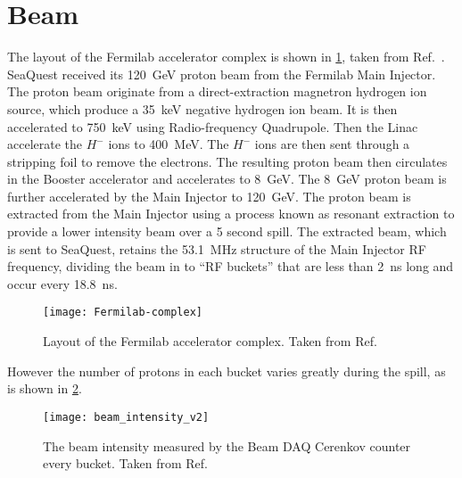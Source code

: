 \documentclass[../main.tex]{subfiles}
\begin{document}
\section{Beam}
The layout of the Fermilab accelerator complex is shown in \cref{fig:complex},
taken from Ref.~\cite{concept-book}.
SeaQuest received its \SI{120}{\GeV} proton beam from the Fermilab Main Injector.
The proton beam originate from a direct-extraction magnetron hydrogen ion source,
which produce a \SI{35}{\keV} negative hydrogen ion beam. It is then accelerated
to \SI{750}{\keV} using Radio-frequency Quadrupole. Then the Linac accelerate the
$H^-$ ions to \SI{400}{\MeV}. The $H^-$ ions are then sent through a stripping foil
to remove the electrons. The resulting proton beam then circulates in the Booster
accelerator and accelerates to \SI{8}{\GeV}. The \SI{8}{\GeV} proton beam is
further accelerated by the Main Injector to \SI{120}{\GeV}. The proton beam is
extracted from the Main Injector using a process known as resonant extraction to
provide a lower intensity beam over a 5 second spill. The extracted beam, which
is sent to SeaQuest, retains the \SI{53.1}{\MHz} structure of the Main
Injector RF frequency, dividing the beam in to ``RF buckets'' that are less than
\SI{2}{\ns} long and occur every \SI{18.8}{\ns}.
\begin{figure}[htbp!]
	\centering
	\texttt{[image: Fermilab-complex]}
	\caption{Layout of the Fermilab accelerator complex. Taken from Ref.~\cite{concept-book}}
	\label{fig:complex}
\end{figure}
However the number of protons in each bucket varies greatly during the spill, as
is shown in \cref{fig:intensity}.
\begin{figure}[htpb!]
	\centering
	\texttt{[image: beam\_intensity\_v2]}
	\caption{The beam intensity measured by the Beam DAQ Cerenkov counter every
		bucket. Taken from Ref.~\cite{aidala2019}}
	\label{fig:intensity}
\end{figure}
\end{document}
